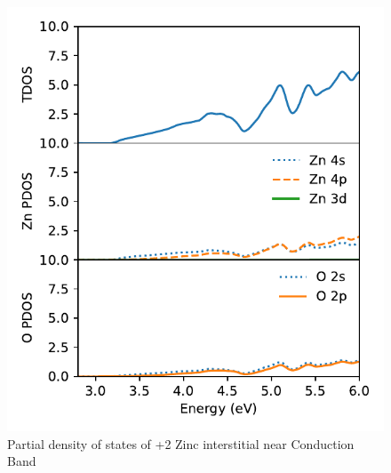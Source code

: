 \begin{figure}[tbh!]
	\centering
	\includegraphics[width=0.5\linewidth]{"images/rnd/dos-pdos-zoom_Zn_i-p2"}
	\caption[Partial density of states of +2 Zinc interstitial near Conduction Band]{Partial density of states of +2 Zinc interstitial near Conduction Band}
\end{figure}


